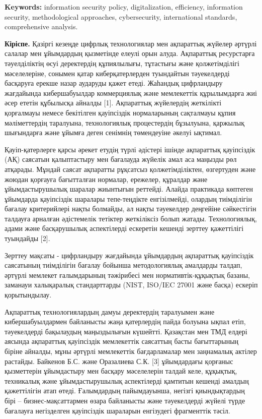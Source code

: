 {\bfseries Keywords:} information security policy, digitalization,
efficiency, information security, methodological approaches,
cybersecurity, international standards, comprehensive analysis.

\begin{multicols}{2}
{\bfseries Кіріспе.} Қазіргі кезеңде цифрлық технологиялар мен ақпараттық
жүйелер әртүрлі салалар мен ұйымдардың қызметінде елеулі орын алуда.
Ақпараттық ресурстарға тәуелділіктің өсуі деректердің құпиялылығы,
тұтастығы және қолжетімділігі мәселелеріне, сонымен қатар
киберқатерлерден туындайтын тәуекелдерді басқаруға ерекше назар аударуды
қажет етеді. Жаһандық цифрландыру жағдайында кибершабуылдар коммерциялық
және мемлекеттік құрылымдарға жиі әсер ететін құбылысқа айналды {[}1{]}.
Ақпараттық жүйелердің жеткілікті қорғалмауы немесе бекітілген
қауіпсіздік нормаларының сақталмауы құпия мәліметтердің таралуына,
технологиялық процестердің бұзылуына, қаржылық шығындарға және ұйымға
деген сенімнің төмендеуіне әкелуі ықтимал.

Қауіп-қатерлерге қарсы әрекет етудің түрлі әдістері ішінде ақпараттық
қауіпсіздік (АҚ) саясатын қалыптастыру мен бағалауда жүйелік амал аса
маңызды рөл атқарады. Мұндай саясат ақпаратты рұқсатсыз
қолжетімділіктен, өзгертуден және жоюдан қорғауға бағытталған нормалар,
ережелер, құралдар және ұйымдастырушылық шаралар жиынтығын реттейді.
Алайда практикада көптеген ұйымдарда қауіпсіздік шаралары тепе-теңдікте
енгізілмейді, олардың тиімділігін бағалау критерийлері нақты болмайды,
ал нақты тәуекелдер деңгейіне сәйкестігін талдауға арналған әдістемелік
тетіктер жеткіліксіз болып жатады. Технологиялық, адами және
басқарушылық аспектілерді ескеретін кешенді зерттеу қажеттілігі
туындайды {[}2{]}.

Зерттеу мақсаты - цифрландыру жағдайында ұйымдардың ақпараттық
қауіпсіздік саясатының тиімділігін бағалау бойынша методологиялық
амалдарды талдап, әртүрлі мемлекет ғалымдарының тәжірибесі мен
нормативтік-құқықтық базаны, заманауи халықаралық стандарттарды (NIST,
ISO/IEC 27001 және басқа) ескеріп қорытындылау.

Ақпараттық технологиялардың дамуы деректердің таралуымен және
кибершабуылдармен байланысты жаңа қатерлердің пайда болуына ықпал етіп,
тәуекелдерді бақылаудың маңыздылығын күшейтті. Қазақстан мен ТМД елдері
аясында ақпараттық қауіпсіздік мемлекеттік саясаттың басты бағыттарының
біріне айналды, мұны әртүрлі мемлекеттік бағдарламалар мен заңнамалық
актілер растайды. Байкенов Б.С. және Оразалиева С.К. {[}3{]} ұйымдардағы
қорғаныс қызметтерін ұйымдастыру мен басқару мәселелерін талдай келе,
құқықтық, техникалық және ұйымдастырушылық аспектілерді қамтитын кешенді
амалдың қажеттілігін атап өтеді. Ғалымдардың пайымдауынша, негізгі
қиындықтардың бірі -- бизнес-мақсаттармен өзара байланысты және
тәуекелдерді жүйелі түрде бағалауға негізделген қауіпсіздік шараларын
енгізудегі фрагменттік тәсіл.


\end{multicols}
